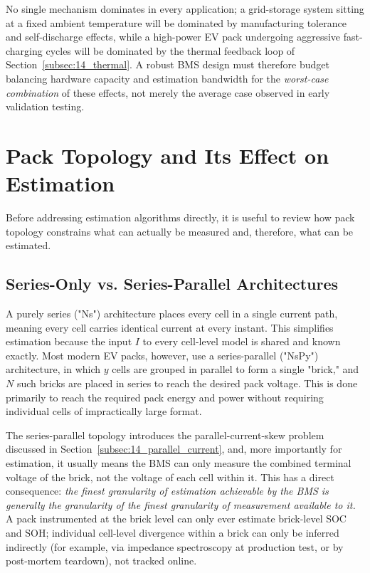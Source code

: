 No single mechanism dominates in every application; a grid-storage system sitting at a fixed ambient temperature will be dominated by manufacturing tolerance and self-discharge effects, while a high-power EV pack undergoing aggressive fast-charging cycles will be dominated by the thermal feedback loop of Section~\ref{subsec:14_thermal}. A robust BMS design must therefore budget balancing hardware capacity and estimation bandwidth for the \emph{worst-case combination} of these effects, not merely the average case observed in early validation testing.

\section{Pack Topology and Its Effect on Estimation}
\label{sec:14_topology}

Before addressing estimation algorithms directly, it is useful to review how pack topology constrains what can actually be measured and, therefore, what can be estimated.

\subsection{Series-Only vs. Series-Parallel Architectures}
\label{subsec:14_series_parallel}

A purely series ("Ns") architecture places every cell in a single current path, meaning every cell carries identical current at every instant. This simplifies estimation because the input $I$ to every cell-level model is shared and known exactly. Most modern EV packs, however, use a series-parallel ("NsPy") architecture, in which $y$ cells are grouped in parallel to form a single "brick," and $N$ such bricks are placed in series to reach the desired pack voltage. This is done primarily to reach the required pack energy and power without requiring individual cells of impractically large format.

The series-parallel topology introduces the parallel-current-skew problem discussed in Section~\ref{subsec:14_parallel_current}, and, more importantly for estimation, it usually means the BMS can only measure the combined terminal voltage of the brick, not the voltage of each cell within it. This has a direct consequence: \emph{the finest granularity of estimation achievable by the BMS is generally the granularity of the finest granularity of measurement available to it.} A pack instrumented at the brick level can only ever estimate brick-level SOC and SOH; individual cell-level divergence within a brick can only be inferred indirectly (for example, via impedance spectroscopy at production test, or by post-mortem teardown), not tracked online.

